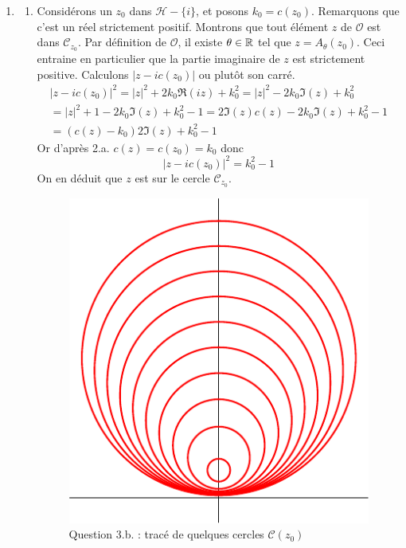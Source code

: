 \begin{enumerate}
\item
\begin{enumerate}
\item Consid{\'e}rons un $z_0$ dans $\mathcal{H}-\{i\}$, et posons $k_0=c(z_0)$. Remarquons que c'est un réel strictement positif.\newline
Montrons que tout élément $z$ de $\mathcal{O}$ est dans $\mathcal{C}_{z_0}$.\newline
Par définition de $\mathcal{O}$, il existe $\theta \in \mathbb{R}$ tel que $z=A_\theta(z_0)$. Ceci entraine en particulier que la partie imaginaire de $z$ est strictement positive. Calculons $|z-ic(z_0)|$ ou plutôt son carré.
\begin{multline*}
 |z-ic(z_0)|^2 = |z|^2 +2k_0\Re(iz)+k_0^2= |z|^2 -2k_0\Im(z)+k_0^2\\
= |z|^2+1 -2k_0\Im(z) + k_0^2 -1 
= 2\Im(z)c(z) -2k_0\Im(z) + k_0^2 -1 \\
= (c(z)-k_0)2\Im(z)+k_0^2-1
\end{multline*}
Or d'après 2.a. $c(z)=c(z_0)=k_0$ donc
\begin{displaymath}
 |z-ic(z_0)|^2 = k_0^2-1
\end{displaymath}
On en déduit que $z$ est sur le cercle $\mathcal{C}_{z_0}$.
\begin{figure}
      \centering
      \includegraphics{CpPoinc_1.pdf}
      \caption{Question 3.b. : tracé de quelques cercles $\mathcal{C}(z_0)$}
      \label{CpPoinc_1}
\end{figure}


\end{enumerate}
\end{enumerate}
